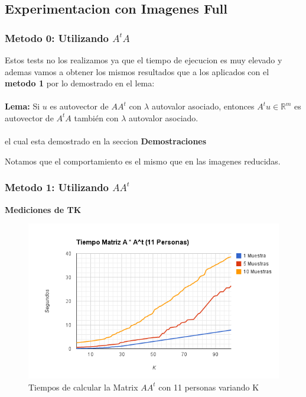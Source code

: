 \subsection{Experimentacion con Imagenes Full}

\subsubsection{Metodo 0: Utilizando $A^tA$}

Estos tests no los realizamos ya que el tiempo de ejecucion es muy elevado y ademas vamos  a obtener
los mismos resultados que a los aplicados con el \textbf{metodo 1} por lo demostrado en el lema: \\
\\ \textbf{Lema:} Si $u$ es autovector de $A A^t$ con $\lambda$ autovalor asociado, entonces $A^t u
\in \mathbb{R}^m$ es autovector de $A^t A$ también con $\lambda$ autovalor asociado.  \\ \\ el cual
esta demostrado en la seccion \textbf{Demostraciones}
 
Notamos que el comportamiento es el mismo que en las imagenes reducidas.

\subsubsection{Metodo 1: Utilizando $AA^t$}

\textbf{Mediciones de TK}

\begin{figure}[H] \includegraphics[width=1\textwidth]{img/imagef1.png} \caption{Tiempos de calcular
    la Matrix $AA^t$ con 11 personas variando K} \end{figure}

